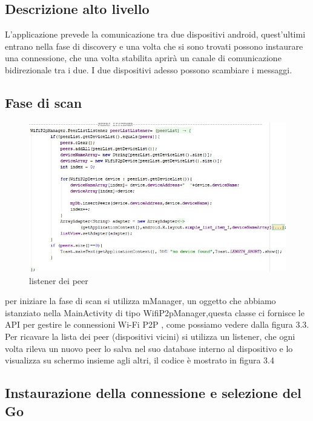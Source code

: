 \subsection{Descrizione alto livello}


L'applicazione prevede la comunicazione tra due dispositivi android,
quest'ultimi entrano nella fase di discovery e una volta che si sono trovati 
possono instaurare una connessione,
che una volta stabilita aprirà un canale di comunicazione bidirezionale tra i due.
I due dispositivi adesso possono scambiare i messaggi.


\subsection{Fase di scan}
\begin{figure}
    \caption{listener dei peer}
    \centering
    \includegraphics[width=1\columnwidth]{imgs/peerListener.png}%
\end{figure}


per iniziare la fase di scan si utilizza mManager, un
oggetto che abbiamo istanziato nella MainActivity
di tipo WifiP2pManager,questa classe ci fornisce le API per gestire le connessioni
Wi-Fi P2P \cite{androiddevelopers},
come possiamo vedere dalla figura 3.3.
Per ricavare la lista dei peer (dispositivi vicini)
 si utilizza un listener, 
che ogni volta rileva un nuovo peer lo salva nel suo database 
interno al dispositivo e lo 
visualizza su schermo insieme agli altri, il codice è mostrato
 in figura 3.4


\subsection{Instaurazione della connessione e selezione del Go}



